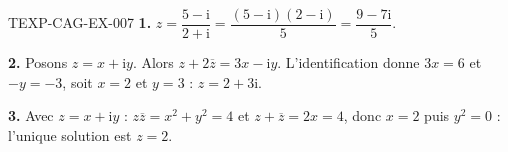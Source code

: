 \begin{corrige}{TEXP-CAG-EX-007}
\textbf{1.} $z=\dfrac{5-\mathrm{i}}{2+\mathrm{i}}
=\dfrac{(5-\mathrm{i})(2-\mathrm{i})}{5}=\dfrac{9-7\mathrm{i}}{5}$.

\textbf{2.} Posons $z=x+\mathrm{i}y$. Alors
$z+2\overline{z}=3x-\mathrm{i}y$. L'identification donne $3x=6$ et $-y=-3$,
soit $x=2$ et $y=3$ : $z=2+3\mathrm{i}$.

\textbf{3.} Avec $z=x+\mathrm{i}y$ : $z\overline{z}=x^2+y^2=4$ et
$z+\overline{z}=2x=4$, donc $x=2$ puis $y^2=0$ : l'unique solution est $z=2$.
\end{corrige}
